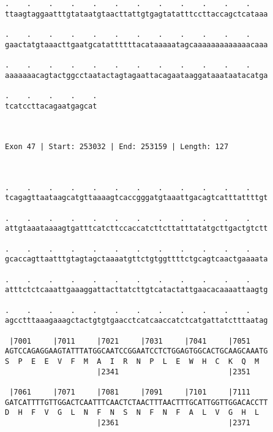 \documentclass{article}
\begin{document}
\begin{Verbatim}
.    .    .    .    .    .    .    .    .    .    .    .    
ttaagtaggaatttgtataatgtaacttattgtgagtatatttccttaccagctcataaa
                                                            
.    .    .    .    .    .    .    .    .    .    .    .    
gaactatgtaaacttgaatgcatattttttacataaaaatagcaaaaaaaaaaaaacaaa
                                                            
.    .    .    .    .    .    .    .    .    .    .    .    
aaaaaaacagtactggcctaatactagtagaattacagaataaggataaataatacatga
                                                            
.    .    .    .    .
tcatccttacagaatgagcat
                     
                     
 
Exon 47 | Start: 253032 | End: 253159 | Length: 127



.    .    .    .    .    .    .    .    .    .    .    .    
tcagagttaataagcatgttaaaagtcaccgggatgtaaattgacagtcatttattttgt
                                                            
.    .    .    .    .    .    .    .    .    .    .    .    
attgtaaataaaagtgatttcatcttccaccatcttcttatttatatgcttgactgtctt
                                                            
.    .    .    .    .    .    .    .    .    .    .    .    
gcaccagttaatttgtagtagctaaaatgttctgtggttttctgcagtcaactgaaaata
                                                            
.    .    .    .    .    .    .    .    .    .    .    .    
atttctctcaaattgaaaggattacttatcttgtcatactattgaacacaaaattaagtg
                                                            
.    .    .    .    .    .    .    .    .    .    .    .    
agcctttaaagaaagctactgtgtgaacctcatcaaccatctcatgattatctttaatag
                                                            
 |7001     |7011     |7021     |7031     |7041     |7051    
AGTCCAGAGGAAGTATTTATGGCAATCCGGAATCCTCTGGAGTGGCACTGCAAGCAAATG
S  P  E  E  V  F  M  A  I  R  N  P  L  E  W  H  C  K  Q  M  
                     |2341                         |2351    
  
 |7061     |7071     |7081     |7091     |7101     |7111    
GATCATTTTGTTGGACTCAATTTCAACTCTAACTTTAACTTTGCATTGGTTGGACACCTT
D  H  F  V  G  L  N  F  N  S  N  F  N  F  A  L  V  G  H  L  
                     |2361                         |2371    
  

\end{Verbatim}
\end{document}
